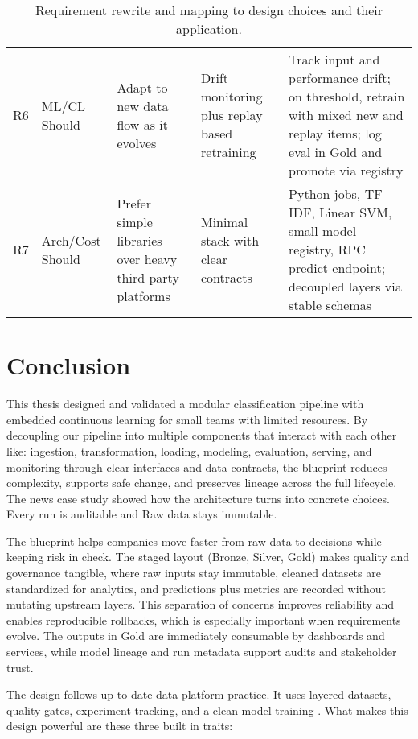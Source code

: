 \begin{table}[tbp]
\begin{tabularx}{\linewidth}{@{}l l Y Y Y@{}}
        R6          & ML/CL Should      & Adapt to new data flow as it evolves                                                     & Drift monitoring plus replay based retraining           & Track input and performance drift; on threshold, retrain with mixed new and replay items; log eval in Gold and promote via registry \\
        R7          & Arch/Cost Should  & Prefer simple libraries over heavy third party platforms                                 & Minimal stack with clear contracts                      & Python jobs, TF IDF, Linear SVM, small model registry, RPC predict endpoint; decoupled layers via stable schemas                    \\
        \bottomrule
    \end{tabularx}
    \caption{Requirement rewrite and mapping to design choices and their application.}
    \label{tab:req_mapping_rewrite}
\end{table}
\FloatBarrier
\section{Conclusion}
This thesis designed and validated a modular classification pipeline with embedded continuous learning for small teams with limited resources. By decoupling our pipeline into multiple components that interact with each other like: ingestion, transformation, loading, modeling, evaluation, serving, and monitoring through clear interfaces and data contracts, the blueprint reduces complexity, supports safe change, and preserves lineage across the full lifecycle. The news case study showed how the architecture turns into concrete choices. Every run is auditable and Raw data stays immutable.

The blueprint helps companies move faster from raw data to decisions while keeping risk in check. The staged layout (Bronze, Silver, Gold) makes quality and governance tangible, where raw inputs stay immutable, cleaned datasets are standardized for analytics, and predictions plus metrics are recorded without mutating upstream layers. This separation of concerns improves reliability and enables reproducible rollbacks, which is especially important when requirements evolve. The outputs in Gold are immediately consumable by dashboards and services, while model lineage and run metadata support audits and stakeholder trust.
\smallbreak

The design follows up to date data platform practice. It uses layered datasets, quality gates, experiment tracking, and a clean model training . What makes this design powerful are these three built in traits:

